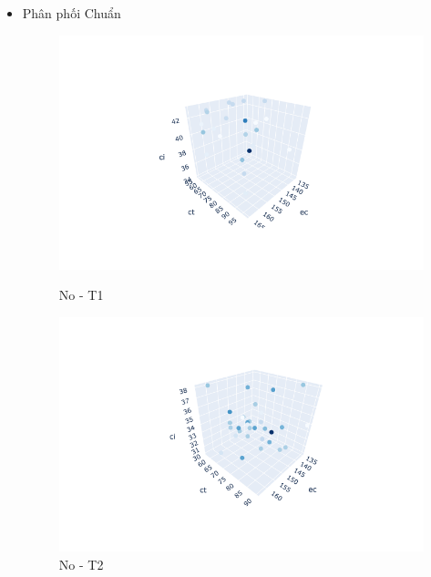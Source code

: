 \documentclass{hust}
\begin{document}
\begin{itemize}
	\item Phân phối Chuẩn
	\begin{figure}[H]
		\begin{minipage}{0.5\textwidth}
			\centering
			\includegraphics[width=1.2\linewidth]{images/no-dem1.png}
			\caption{No - T1}\label{fig:nsga-ii-no-dem1}
		\end{minipage}\hfill
		\begin{minipage}{0.5\textwidth}
			\centering
			\includegraphics[width=1.2\linewidth]{images/no-dem2.png}
			\caption{No - T2}\label{fig:nsga-ii-no-dem2}
		\end{minipage}
	\end{figure}
	

\end{itemize}
\end{document}
